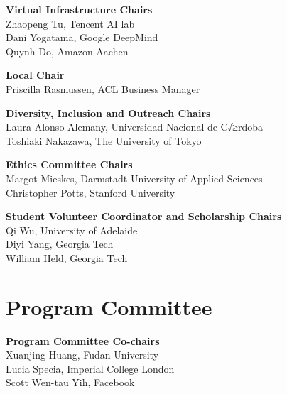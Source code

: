 {\bf Virtual Infrastructure Chairs} \\
Zhaopeng Tu, Tencent AI lab\\
Dani Yogatama, Google DeepMind \\
Quynh Do, Amazon Aachen

{\bf Local Chair} \\
Priscilla Rasmussen, ACL Business Manager

{\bf Diversity, Inclusion and Outreach Chairs} \\
Laura Alonso Alemany, Universidad Nacional de C√≥rdoba \\
Toshiaki Nakazawa, The University of Tokyo

{\bf Ethics Committee Chairs} \\
Margot Mieskes, Darmstadt University of Applied Sciences \\
Christopher Potts, Stanford University

{\bf Student Volunteer Coordinator and Scholarship Chairs} \\
Qi Wu, University of Adelaide \\
Diyi Yang, Georgia Tech\\
William Held, Georgia Tech



\clearpage
\section{Program Committee}
\setlength{\parindent}{0pt}

\vspace*{0.5cm}

{\bf Program Committee Co-chairs} \\
Xuanjing Huang, Fudan University\\
Lucia Specia, Imperial College London\\
Scott Wen-tau Yih, Facebook

